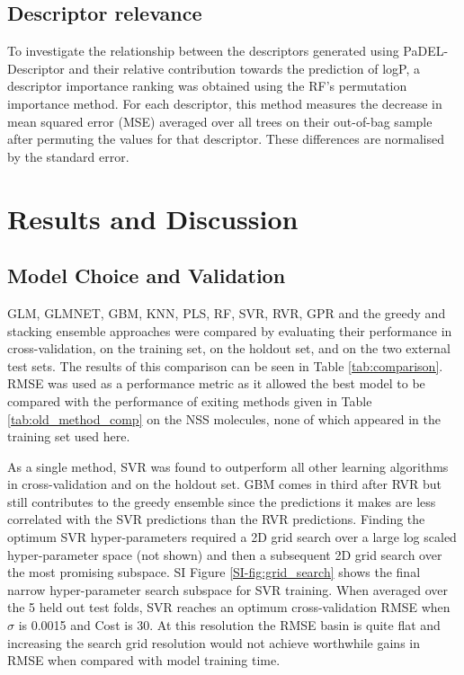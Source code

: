 \documentclass[10pt]{bmc_article}
\newenvironment{bmcformat}{\begin{raggedright}\baselineskip20pt\sloppy\setboolean{publ}{false}}{\end{raggedright}\baselineskip20pt\sloppy}
\begin{document}
\begin{bmcformat}
\subsection*{Descriptor relevance}
To investigate the relationship between the descriptors generated using PaDEL-Descriptor and their relative contribution towards the prediction of logP, a descriptor importance ranking was obtained using the RF's permutation importance method. For each descriptor, this method measures the decrease in mean squared error (MSE) averaged over all trees on their out-of-bag sample after permuting the values for that descriptor. These differences are normalised by the standard error.

\newpage

\section*{Results and Discussion} 

\subsection*{Model Choice and Validation}
GLM, GLMNET, GBM, KNN, PLS, RF, SVR, RVR, GPR and the greedy and stacking ensemble approaches were compared by evaluating their performance in cross-validation, on the training set, on the holdout set, and on the two external test sets. The results of this comparison can be seen in Table \ref{tab:comparison}. RMSE was used as a performance metric as it allowed the best model to be compared with the performance of exiting methods given in Table \ref{tab:old_method_comp} on the NSS molecules, none of which appeared in the training set used here. 

As a single method, SVR was found to outperform all other learning algorithms in cross-validation and on the holdout set. GBM comes in third after RVR but still contributes to the greedy ensemble since the predictions it makes are less correlated with the SVR predictions than the RVR predictions. Finding the optimum SVR hyper-parameters required a 2D grid search over a large log scaled hyper-parameter space (not shown) and then a subsequent 2D grid search over the most promising subspace. SI Figure \ref{SI-fig:grid_search} shows the final narrow hyper-parameter search subspace for SVR training. When averaged over the 5 held out test folds, SVR reaches an optimum cross-validation RMSE when $\sigma$ is 0.0015 and Cost is 30. At this resolution the RMSE basin is quite flat and increasing the search grid resolution would not achieve worthwhile gains in RMSE when compared with model training time. 


\end{bmcformat}
\end{document}
